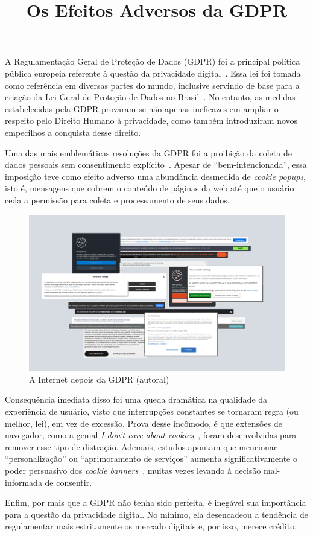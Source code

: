 \documentclass[
    report,
    11pt,
    oneside,
    a4paper,
    english,
    brazil,
    sumario=tradicional
    ]{abntex2}
\title{Os Efeitos Adversos da GDPR}
\begin{document}

\frenchspacing

\maketitle

\textual

A Regulamentação Geral de Proteção de Dados (GDPR) foi a principal política pública europeia referente à questão da privacidade digital~\cite{gdpr}. Essa lei foi tomada como referência em diversas partes do mundo, inclusive servindo de base para a criação da Lei Geral de Proteção de Dados no Brasil~\cite{lgpd}. No entanto, as medidas estabelecidas pela GDPR provaram-se não apenas ineficazes em ampliar o respeito pelo Direito Humano à privacidade, como também introduziram novos empecilhos a conquista desse direito.

Uma das mais emblemáticas resoluções da GDPR foi a proibição da coleta de dados pessoais sem consentimento explícito~\cite{data-consent}. Apesar de ``bem-intencionada'', essa imposição teve como efeito adverso uma abundância desmedida de \textit{cookie popups}, isto é, mensagens que cobrem o conteúdo de páginas da web até que o usuário ceda a permissão para coleta e processamento de seus dados.

\begin{figure}[h]
    \includegraphics[width=\textwidth]{cookies.png}
    \centering
    \caption{A Internet depois da GDPR (autoral)}
\end{figure}

Consequência imediata disso foi uma queda dramática na qualidade da experiência de usuário, visto que interrupções constantes se tornaram regra (ou melhor, lei), em vez de excessão. Prova desse incômodo, é que extensões de navegador, como a genial \textit{I don't care about cookies}~\cite{i-dont-care-about-cookies}, foram desenvolvidas para remover esse tipo de distração. Ademais, estudos apontam que mencionar ``personalização'' ou ``aprimoramento de serviços'' aumenta significativamente o poder persuasivo dos \textit{cookie banners}~\cite{cookie-strategies}, muitas vezes levando à decisão mal-informada de consentir.

Enfim, por mais que a GDPR não tenha sido perfeita, é inegável sua importância para a questão da privacidade digital. No mínimo, ela desencadeou a tendência de regulamentar mais estritamente os mercado digitais \cite{dma} e, por isso, merece crédito.

\pagebreak

\postextual


\end{document}
